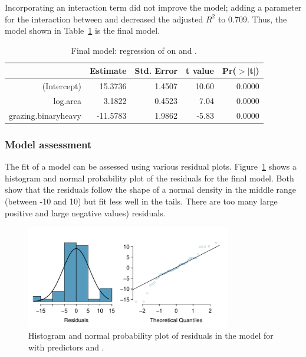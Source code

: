 Incorporating an interaction term did not improve the model; adding a parameter for the interaction between  and  decreased the adjusted $R^2$ to 0.709. Thus, the model shown in Table~\ref{forestbirdsAbunLogAreaGrazingLevelRegress} is the final model.

\begin{table}[ht]
	\centering
	\begin{tabular}{rrrrr}
		\hline
		& Estimate & Std. Error & t value & Pr($>$$|$t$|$) \\ 
		\hline
		(Intercept) & 15.3736 & 1.4507 & 10.60 & 0.0000 \\ 
		log.area & 3.1822 & 0.4523 & 7.04 & 0.0000 \\ 
		grazing.binaryheavy & -11.5783 & 1.9862 & -5.83 & 0.0000 \\ 
		\hline
	\end{tabular}
	\caption{Final model: regression of  on  and .}
	\label{forestbirdsAbunLogAreaGrazingLevelRegress}
\end{table}


\subsubsection{Model assessment}

The fit of a model can be assessed using various residual plots. Figure~\ref{forestbirdsAbunLogAreaGrazingNormPlots} shows a histogram and normal probability plot of the residuals for the final model. Both show that the residuals follow the shape of a normal density in the middle range (between -10 and 10) but fit less well in the tails. There are too many large positive and large negative values) residuals.

 \begin{figure}[h!]
 	\centering
 	\includegraphics[width=0.8\textwidth]
{ch_multiple_linear_regression_oi_biostat/figures/forestbirdsAbunLogAreaGrazingNormPlots/forestbirdsAbunLogAreaGrazingNormPlots.pdf}
     \caption{Histogram and normal probability plot of residuals in the model for  with predictors  and .}
    	\label{forestbirdsAbunLogAreaGrazingNormPlots}
 \end{figure}

